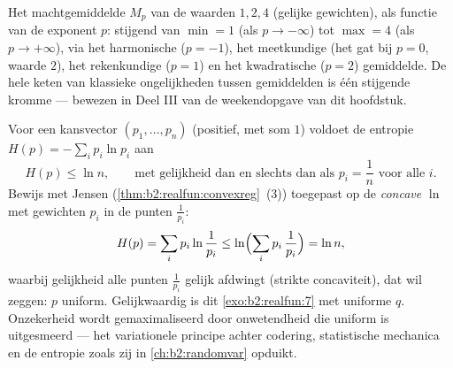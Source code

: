 \begin{omfigure}

{\small Het machtgemiddelde $M_p$ van de waarden $1, 2, 4$ (gelijke
gewichten), als functie van de exponent $p$: stijgend van $\min =
1$ (als $p \to -\infty$) tot $\max = 4$ (als $p \to +\infty$), via
het harmonische ($p = -1$), het meetkundige (het gat bij $p = 0$,
waarde $2$), het rekenkundige ($p = 1$) en het kwadratische ($p =
2$) gemiddelde. De hele keten van klassieke ongelijkheden tussen
gemiddelden is één stijgende kromme --- bewezen in Deel III van de
weekendopgave van dit hoofdstuk.}
\end{omfigure}

\begin{example}\label{ex:b2:realfun:entropy}
Voor een kansvector $(p_1, \dots, p_n)$ (positief, met som $1$)
voldoet de entropie $H(p) = -\sum_i p_i\ln p_i$ aan
\[
H(p) \leq \ln n ,
\qquad\text{met gelijkheid dan en slechts dan als } p_i =
\frac1n \text{ voor alle } i .
\]
Bewijs met Jensen (\cref{thm:b2:realfun:convexreg}~(3)) toegepast
op de \emph{concave} $\ln$ met gewichten $p_i$ in de punten
$\frac{1}{p_i}$:
\[
H(p) = \sum_i p_i\ln\frac{1}{p_i}
\leq \ln\Bigl(\sum_i p_i\,\frac1{p_i}\Bigr) = \ln n ,
\]
waarbij gelijkheid alle punten $\frac1{p_i}$ gelijk afdwingt
(strikte concaviteit), dat wil zeggen: $p$ uniform. Gelijkwaardig
is dit \cref{exo:b2:realfun:7} met uniforme $q$. Onzekerheid wordt
gemaximaliseerd door onwetendheid die uniform is uitgesmeerd ---
het variationele principe achter codering, statistische mechanica
en de entropie zoals zij in \cref{ch:b2:randomvar} opduikt.
\end{example}

